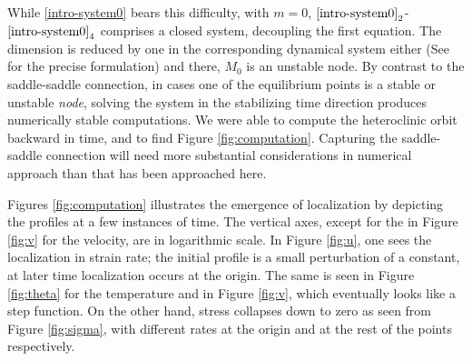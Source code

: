 \documentclass[a4paper,11pt]{article}
\theoremstyle{remark}
\begin{document}
While \eqref{intro-system0} bears this difficulty, with $m=0$, $\eqref{intro-system0}_2$-$\eqref{intro-system0}_4$ comprises a closed system, decoupling the first equation. The dimension is reduced by one in the corresponding dynamical system either (See \cite{KLT_HYP2016} for the precise formulation) and there, $M_0$ is an unstable node. By contrast to the saddle-saddle connection, in cases one of the equilibrium points is a stable or unstable {\it node}, solving the system in the stabilizing time direction produces numerically stable computations. We were able to compute the heteroclinic orbit backward in time, and to find Figure \ref{fig:computation}. Capturing the saddle-saddle connection will need more substantial considerations in numerical approach than that has been approached here.


Figures \ref{fig:computation} illustrates the emergence of localization by depicting the profiles at a few instances of time. The vertical axes, except for the in Figure \ref{fig:v} for the velocity, are in logarithmic scale. In Figure \ref{fig:u}, one sees the localization in strain rate; the initial profile is a small perturbation of
a constant, at later time localization occurs at the origin. The same is seen in Figure \ref{fig:theta} 
for the temperature and in  Figure \ref{fig:v}, which eventually looks like a step function. On the other hand, stress collapses down to zero as seen from Figure \ref{fig:sigma}, with different rates at the origin and at the rest of the points respectively.
\end{document}
